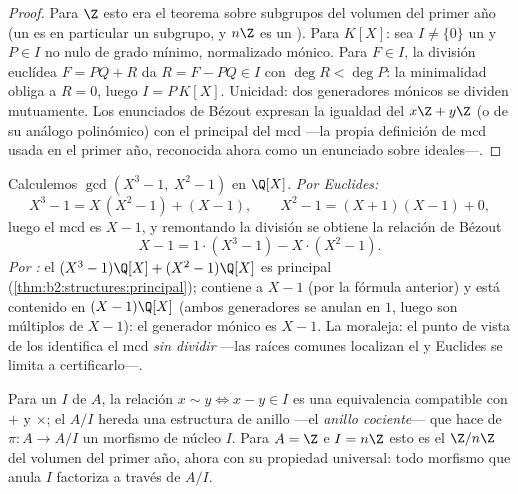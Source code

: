 \begin{proof}
Para $\Z$ esto era el teorema sobre subgrupos del volumen del primer
año (un  es en particular un subgrupo, y $n\Z$ es un ).
Para $K[X]$: sea $I \neq \{0\}$ un  y $P \in I$ no nulo de grado
mínimo, normalizado mónico. Para $F \in I$, la división euclídea $F =
PQ + R$ da $R = F - PQ \in I$ con $\deg R < \deg P$: la minimalidad
obliga a $R = 0$, luego $I = P\,K[X]$. Unicidad: dos generadores
mónicos se dividen mutuamente. Los enunciados de Bézout expresan la
igualdad del  $x\Z + y\Z$ (o de su análogo polinómico) con el
 principal del mcd ---la propia definición de mcd usada en el
primer año, reconocida ahora como un enunciado sobre ideales---.
\end{proof}

\begin{example}\label{ex:b2:structures:polygcd}
Calculemos $\gcd(X^3 - 1,\ X^2 - 1)$ en $\Q[X]$. \emph{Por
Euclides:}
\[
X^3 - 1 = X\,(X^2 - 1) + (X - 1),
\qquad
X^2 - 1 = (X + 1)(X - 1) + 0 ,
\]
luego el mcd es $X - 1$, y remontando la división se obtiene la
relación de Bézout
\[
X - 1 = 1\cdot(X^3 - 1) - X\cdot(X^2 - 1).
\]
\emph{Por :} el  $(X^3 - 1)\Q[X] + (X^2 - 1)\Q[X]$
es principal (\cref{thm:b2:structures:principal}); contiene a $X -
1$ (por la fórmula anterior) y está contenido en $(X - 1)\Q[X]$
(ambos generadores se anulan en $1$, luego son múltiplos de $X -
1$): el generador mónico es $X - 1$. La moraleja: el punto de
vista de los  identifica el mcd \emph{sin dividir} ---las
raíces comunes localizan el  y Euclides se limita a
certificarlo---.
\end{example}

\begin{definition}\label{def:b2:structures:quotientring}
Para un  $I$ de $A$, la relación $x \sim y \iff x - y \in I$ es
una equivalencia compatible con $+$ y $\times$; el 
$A/I$ hereda una estructura de anillo ---el \emph{anillo
cociente}--- que hace de $\pi \colon A \to
A/I$ un morfismo de núcleo $I$. Para $A = \Z$ e $I = n\Z$ esto es el
$\Z/n\Z$ del volumen del primer año, ahora con su propiedad
universal: todo morfismo que anula $I$ factoriza a través de $A/I$.
\end{definition}

